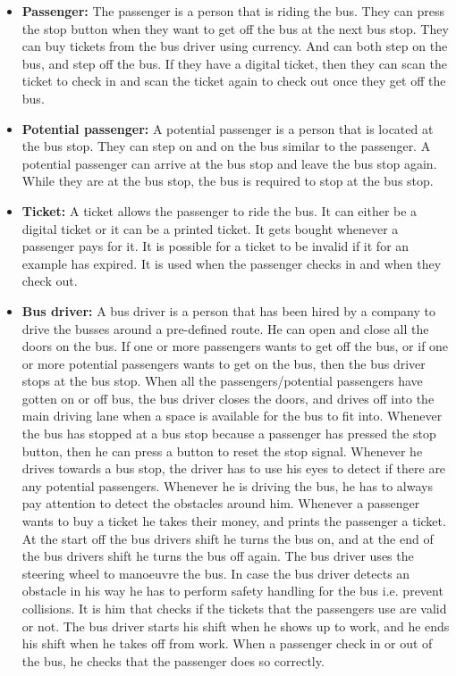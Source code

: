 \begin{itemize}
\item \textbf{Passenger:}
The passenger is a person that is riding the bus. They can press the stop button when they want to get off the bus at the next bus stop. They can buy tickets from the bus driver using currency. And can both step on the bus, and step off the bus. If they have a digital ticket, then they can scan the ticket to check in and scan the ticket again to check out once they get off the bus.
\item \textbf{Potential passenger:}
A potential passenger is a person that is located at the bus stop. They can step on and on the bus similar to the passenger. A potential passenger can arrive at the bus stop and leave the bus stop again. While they are at the bus stop, the bus is required to stop at the bus stop.
\item \textbf{Ticket:}
A ticket allows the passenger to ride the bus. It can either be a digital ticket or it can be a printed ticket. It gets bought whenever a passenger pays for it. It is possible for a ticket to be invalid if it for an example has expired. It is used when the passenger checks in and when they check out.
\item \textbf{Bus driver:}
A bus driver is a person that has been hired by a company to drive the busses around a pre-defined route. He can open and close all the doors on the bus.
If one or more passengers wants to get off the bus, or if one or more potential passengers wants to get on the bus, then the bus driver stops at the bus stop. When all the passengers/potential passengers have gotten on or off bus, the bus driver closes the doors, and drives off into the main driving lane when a space is available for the bus to fit into. Whenever the bus has stopped at a bus stop because a passenger has pressed the stop button, then he can press a button to reset the stop signal. Whenever he drives towards a bus stop, the driver has to use his eyes to detect if there are any potential passengers. Whenever he is driving the bus, he has to always pay attention to detect the obstacles around him. Whenever a passenger wants to buy a ticket he takes their money, and prints the passenger a ticket. At the start off the bus drivers shift he turns the bus on, and at the end of the bus drivers shift he turns the bus off again. The bus driver uses the steering wheel to manoeuvre the bus. In case the bus driver detects an obstacle in his way he has to perform safety handling for the bus i.e. prevent collisions. It is him that checks if the tickets that the passengers use are valid or not. The bus driver starts his shift when he shows up to work, and he ends his shift when he takes off from work. When a passenger check in or out of the bus, he checks that the passenger does so correctly. 

\end{itemize}
